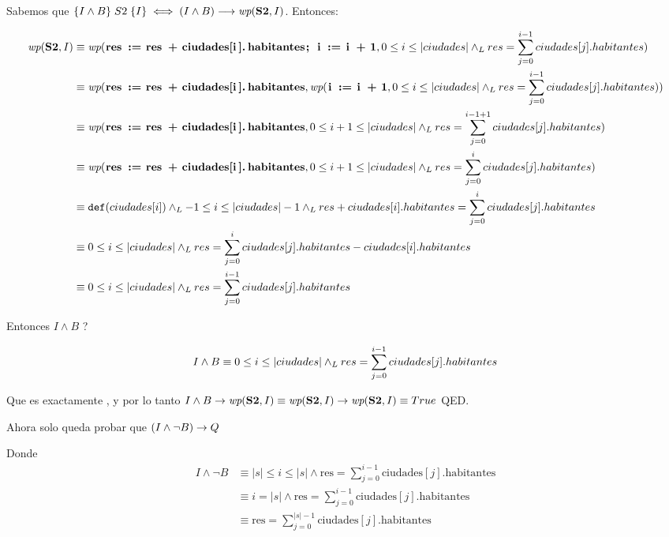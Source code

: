 \documentclass[10pt,a4paper]{article}
\begin{document}
Sabemos que $\hoare{I \land B}{S2}{I} \iff (I \land B) \implica \wp{S2}{I}$. Entonces:

\begin{align*}
	\wp{S2}{I} & \equiv  \wp{ res := res + ciudades[i].habitantes; i := i + 1}{0 \leq i \leq |ciudades| \yLuego res = \sum_{j=0}^{i-1} ciudades[j].habitantes}      \\
	           & \equiv  \wp{ res := res + ciudades[i].habitantes}{\wp{i := i + 1}{0 \leq i \leq |ciudades| \yLuego res = \sum_{j=0}^{i-1} ciudades[j].habitantes}} \\
	           & \equiv  \wp{ res := res + ciudades[i].habitantes}{0 \leq i+1 \leq |ciudades| \yLuego res = \sum_{j=0}^{i-1 + 1} ciudades[j].habitantes}            \\
	           & \equiv  \wp{ res := res + ciudades[i].habitantes}{0 \leq i+1 \leq |ciudades| \yLuego res = \sum_{j=0}^{i} ciudades[j].habitantes}                  \\
	           & \equiv  \Def{ciudades[i]} \yLuego -1 \leq i \leq |ciudades| -1 \yLuego res + ciudades[i].habitantes = \sum_{j=0}^{i} ciudades[j].habitantes        \\
	           & \equiv  0 \leq i \leq |ciudades| \yLuego res = \sum_{j=0}^{i} ciudades[j].habitantes - ciudades[i].habitantes                                      \\
	           & \equiv  0 \leq i \leq |ciudades|  \yLuego res = \sum_{j=0}^{i-1} ciudades[j].habitantes
\end{align*}


Entonces $\ensuremath{I \land B}$  \implica {}?

\[{I \land B}  \equiv  0 \leq i \leq |ciudades|  \land _L res = \sum_{j=0}^{i-1} ciudades[j].habitantes \]

Que es exactamente , y por lo tanto $I \land B \Then\wp{S2}{I} \equiv \wp{S2}{I} \Then \wp{S2}{I} \equiv True$ QED.

\bigskip

Ahora solo queda probar que  $(I \land \neg B) \rightarrow Q$

Donde
\begin{align*}
	I \land \neg B & \equiv |s| \leq i \leq |s| \land \text{res} = \sum_{j=0}^{i-1} \text{ciudades}[j].\text{habitantes} \\
	               & \equiv i = |s| \land \text{res} = \sum_{j=0}^{i-1} \text{ciudades}[j].\text{habitantes}             \\
	               & \equiv \text{res} = \sum_{j=0}^{|s|-1} \text{ciudades}[j].\text{habitantes}                         \\
\end{align*}
\end{document}
